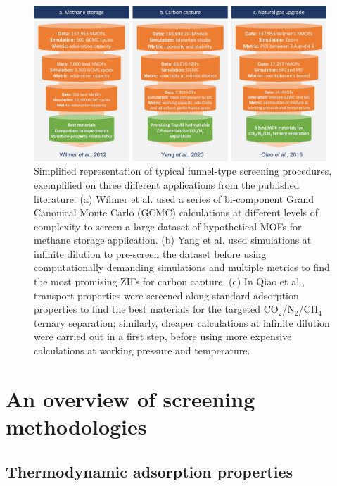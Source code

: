 \documentclass[main.tex]{subfiles}
\begin{document}
\begin{figure}[t]
    \centering
      \includegraphics[width=0.98\textwidth]{figures/1-screening/Screening_procedures.jpg}
      \caption{Simplified representation of typical funnel-type screening procedures, exemplified on three different applications from the published literature. (a) Wilmer et al.\cite{Wilmer_2012} used a series of bi-component Grand Canonical Monte Carlo (GCMC) calculations at different levels of complexity to screen a large dataset of hypothetical MOFs for methane storage application. (b) Yang et al.\cite{Yang_2020} used simulations at infinite dilution to pre-screen the dataset before using computationally demanding simulations and multiple metrics to find the most promising ZIFs for carbon capture. (c) In Qiao et al.\cite{Qiao_2016}, transport properties were screened along standard adsorption properties to find the best materials for the targeted CO$_2$/N$_2$/CH$_4$ ternary separation; similarly, cheaper calculations at infinite dilution were carried out in a first step, before using more expensive calculations at working pressure and temperature.}\label{fgr:screening}
    \end{figure}

\subsection{}

\section{An overview of screening methodologies}

\subsection{Thermodynamic adsorption properties}
\end{document}
